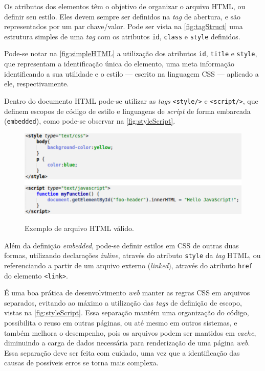 Os atributos dos elementos têm o objetivo de organizar o arquivo HTML, ou definir seu estilo. Eles devem sempre ser definidos na \textit{tag} de abertura, e são representados por um par chave/valor. Pode ser vista na \autoref{fig:tagStruct} uma estrutura simples de uma \textit{tag} com os atributos \texttt{id}, \texttt{class} e \texttt{style} definidos.

Pode-se notar na \autoref{fig:simpleHTML} a utilização dos atributos \texttt{id}, \texttt{title} e \texttt{style}, que representam a identificação única do elemento, uma meta informação identificando a sua utilidade e o estilo --- escrito na linguagem CSS --- aplicado a ele, respectivamente.

Dentro do documento HTML pode-se utilizar as \textit{tags} \texttt{<style/>} e \texttt{<script/>}, que definem escopos de código de estilo e linguagens de \textit{script} de forma embarcada (\texttt{embedded}), como pode-se observar na \autoref{fig:styleScript}.

\begin{figure}[!htb]
	\centering
	\caption{Exemplo de arquivo HTML válido.}
	\includegraphics[width=1\textwidth]{./04-figuras/style_script}
	\label{fig:styleScript}
\end{figure}

Além da definição \textit{embedded}, pode-se definir estilos em CSS de outras duas formas, utilizando declarações \textit{inline}, através do atributo \texttt{style} da \textit{tag} HTML, ou referenciando a partir de um arquivo externo (\textit{linked}), através do atributo \texttt{href} do elemento \texttt{<link>}. 

É uma boa prática de desenvolvimento \textit{web} manter as regras CSS em arquivos separados, evitando ao máximo a utilização das \textit{tags} de definição de escopo, vistas na \autoref{fig:styleScript}. Essa separação mantém uma organização do código, possibilita o reuso em outras páginas, ou até mesmo em outros sistemas, e também melhora o desempenho, pois os arquivos podem ser mantidos em \textit{cache}, diminuindo a carga de dados necessária para renderização de uma página \textit{web}. Essa separação deve ser feita com cuidado, uma vez que a identificação das causas de possíveis erros se torna mais complexa.

